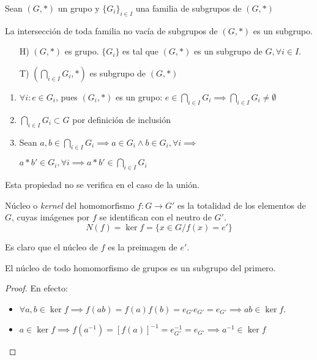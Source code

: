 	Sean $(G, *)$ un grupo y $\{G_i\}_{i \in I}$ una familia de subgrupos de $(G, *)$
	\begin{fmd-theorem}
		La intersección de toda familia no vacía de subgrupos de $(G, *)$ es un subgrupo.
	\end{fmd-theorem}
	
	\begin{fmd-proof}
		\begin{itemize}
			\item[H)] $(G, *)$ es grupo. $\{G_i\}$ es tal que $(G, *)$ es un subgrupo de $G, \forall i \in I$.
			\item[T)] $\left( \bigcap_{i \in I} G_i, * \right)$ es subgrupo de $(G, *)$
		\end{itemize}
		\begin{enumerate}[label=\roman*)]
			\item $\forall i: e \in G_i$, pues $(G_i, *)$ es un grupo: $e \in \bigcap_{i \in I} G_i \implies \bigcap_{i \in I} G_i \ne \emptyset$
			\item $\bigcap_{i \in I} G_i \subset G$ por definición de inclusión
			\item Sean $a, b \in \bigcap_{i \in I}G_i \implies a \in G_i \land b \in G_i, \forall i \implies$
			
			$a * b'\in G_i, \forall i \implies a * b' \in \bigcap_{i \in I}G_i$
		\end{enumerate}
	\end{fmd-proof}
	Esta propiedad no se verifica en el caso de la unión.

	\begin{fmd-definition}
		Núcleo o \textit{kernel} del homomorfismo $f: G \rightarrow G'$ es la totalidad de los elementos de $G$, cuyas imágenes por $f$ se identifican con el neutro de $G'$.
		\[ N(f) = \ker f = \{ x \in G / f(x) = e' \} \]
	\end{fmd-definition}
	Es claro que el núcleo de $f$ es la preimagen de $e'$.
	
\begin{figure}[H]
	\centering
	
	\caption{}
	\label{fig:kernel}
\end{figure}

	\begin{proposition}
		El núcleo de todo homomorfismo de grupos es un subgrupo del primero.
	\end{proposition}
	\begin{proof}
		En efecto:
		\begin{itemize}
			\item $\forall a, b \in \ker f \implies f(ab) = f(a)f(b) = e_{G'} e_{G'} = e_{G'} \implies ab \in \ker f$.
			\item $a \in \ker f \implies f(a^{-1}) = \left[ f(a) \right]^{-1}=e_{G'}^{-1} = e_{G'} \implies a^{-1} \in \ker f$
		\end{itemize}
	\end{proof}
	
